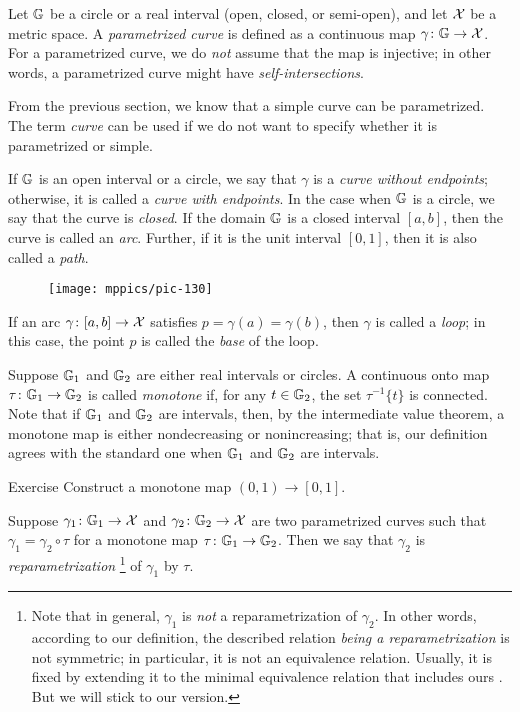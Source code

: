 Let $\mathbb{G}$ be a circle or a real interval (open, closed, or semi-open), and let $\mathcal{X}$ be a metric space.
A \emph{parametrized curve} is defined as a continuous map $\gamma\colon\mathbb{G}\to\mathcal{X}$. 
For a parametrized curve, we do \textit{not} assume that the map is injective; in other words, a parametrized curve might have {}\emph{self-intersections}.

From the previous section, we know that a simple curve can be parametrized.
The term \emph{curve} can be used if we do not want to specify whether it is parametrized or simple.

If $\mathbb{G}$ is an open interval or a circle, we say that $\gamma$ is a {}\emph{curve without endpoints};
otherwise, it is called a {}\emph{curve with endpoints}.
In the case when $\mathbb{G}$ is a circle, we say that the curve is \emph{closed}. 
If the domain $\mathbb{G}$ is a closed interval $[a,b]$, then the curve is called an \emph{arc}.
Further, if it is the unit interval $[0,1]$, then it is also called a \emph{path}.

\begin{wrapfigure}{o}{15 mm}
\vskip-0mm
\centering
\texttt{[image: mppics/pic-130]}
\end{wrapfigure}


If an arc $\gamma \colon [a,b] \to \mathcal{X}$ satisfies $p=\gamma (a)=\gamma (b)$, then $\gamma$ is called a \emph{loop};
in this case, the point $p$ is called the \emph{base} of the loop.

Suppose $\mathbb{G}_1$ and $\mathbb{G}_2$ are either real intervals or circles.
A continuous onto map $\tau\colon\mathbb{G}_1\to\mathbb{G}_2$ is called \emph{monotone} if, for any $t\in \mathbb{G}_2$, the set $\tau^{-1}\{t\}$ is connected.
Note that if $\mathbb{G}_1$ and $\mathbb{G}_2$ are intervals, then, by the intermediate value theorem, a monotone map is either nondecreasing or nonincreasing;
that is, our definition agrees with the standard one when $\mathbb{G}_1$ and $\mathbb{G}_2$ are intervals.

\begin{thm}{Exercise}\label{ex:mono}
Construct a monotone map $(0,1)\to [0,1]$.
\end{thm}


Suppose $\gamma_1\colon\mathbb{G}_1\to \mathcal{X}$ and $\gamma_2\colon\mathbb{G}_2\to \mathcal{X}$ are two parametrized curves such that 
$\gamma_1=\gamma_2\circ\tau$ for a monotone map $\tau\colon\mathbb{G}_1\to\mathbb{G}_2$.
Then we say that $\gamma_2$ is \emph{reparametrization}%
\footnote{Note that in general, $\gamma_1$ is \textit{not} a reparametrization of $\gamma_2$.
In other words, according to our definition, the described relation \textit{being a reparametrization} is not symmetric;
in particular, it is not an equivalence relation.
Usually, it is fixed by extending it to the minimal equivalence relation that includes ours \cite[2.5.1]{burago-burago-ivanov}.
But we will stick to our version.}
of $\gamma_1$ by $\tau$.


